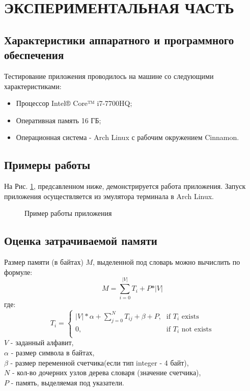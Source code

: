 \documentclass[a4paper,12pt]{article}
\begin{document}
\newpage
\section{ЭКСПЕРИМЕНТАЛЬНАЯ ЧАСТЬ}
\subsection{Характеристики аппаратного и программного обеспечения}
Тестирование приложения проводилось на машине со следующими характеристиками:\\
\begin{itemize}
\item Процессор Intel® Core™ i7-7700HQ;
\item Оперативная память 16 ГБ;
\item Операционная система - Arch Linux с рабочим окружением Cinnamon.
\end{itemize}

\newpage
\subsection{Примеры работы}
На Рис. \ref{images:example}, предсавленном ниже, демонстрируется работа приложения. Запуск приложения осуществляется из эмулятора терминала в Arch Linux.
\begin{figure}[h]
\caption{Пример работы приложения}
\label{images:example}
\end{figure}

\newpage
\subsection{Оценка затрачиваемой памяти}
Размер памяти (в байтах) $M$, выделенной под словарь можно вычислить по формуле:\\
\begin{equation}
M =  \sum_{i = 0}^{\vert V \vert} T_i + P * \vert V \vert
\end{equation}
где:\\
\begin{equation}
T_i = \left\{
\begin{array}{ll}
\vert V \vert * \alpha + \sum_{j = 0}^N T_{ij} + \beta + P\text{,} & \text{if } T_i \text{ exists} \\
0\text{,} & \text{if } T_i \text{ not exists} \\
\end{array}
\right.
\end{equation}
$V$ - заданный алфавит, \\
$\alpha$ - размер символа в байтах, \\
$\beta$ - размер переменной счетчика(если тип integer - 4 байт),\\
$N$ - кол-во дочерних узлов дерева словаря (значение счетчика), \\
$P$ - память, выделяемая под указатели.
\end{document}
